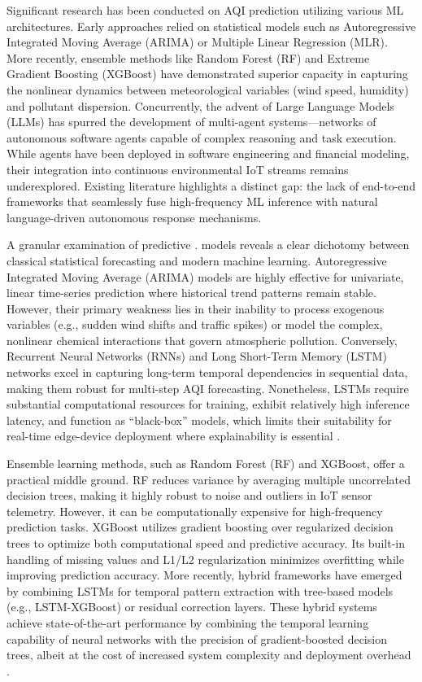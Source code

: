 \documentclass[conference]{IEEEtran}
\begin{document}
Significant research has been conducted on AQI prediction utilizing various ML architectures. Early approaches relied on statistical models such as Autoregressive Integrated Moving Average (ARIMA) or Multiple Linear Regression (MLR). More recently, ensemble methods like Random Forest (RF) and Extreme Gradient Boosting (XGBoost) have demonstrated superior capacity in capturing the nonlinear dynamics between meteorological variables (wind speed, humidity) and pollutant dispersion. Concurrently, the advent of Large Language Models (LLMs) has spurred the development of multi-agent systems---networks of autonomous software agents capable of complex reasoning and task execution. While agents have been deployed in software engineering and financial modeling, their integration into continuous environmental IoT streams remains underexplored. Existing literature highlights a distinct gap: the lack of end-to-end frameworks that seamlessly fuse high-frequency ML inference with natural language-driven autonomous response mechanisms.

A granular examination of predictive \cite{b18,b19}. models reveals a clear dichotomy between classical statistical forecasting and modern machine learning. Autoregressive Integrated Moving Average (ARIMA) models are highly effective for univariate, linear time-series prediction where historical trend patterns remain stable. However, their primary weakness lies in their inability to process exogenous variables (e.g., sudden wind shifts and traffic spikes) or model the complex, nonlinear chemical interactions that govern atmospheric pollution. Conversely, Recurrent Neural Networks (RNNs) and Long Short-Term Memory (LSTM) networks excel in capturing long-term temporal dependencies in sequential data, making them robust for multi-step AQI forecasting. Nonetheless, LSTMs require substantial computational resources for training, exhibit relatively high inference latency, and function as ``black-box'' models, which limits their suitability for real-time edge-device deployment where explainability is essential \cite{b20,b21}.

Ensemble learning methods, such as Random Forest (RF) and XGBoost, offer a practical middle ground. RF reduces variance by averaging multiple uncorrelated decision trees, making it highly robust to noise and outliers in IoT sensor telemetry. However, it can be computationally expensive for high-frequency prediction tasks. XGBoost utilizes gradient boosting over regularized decision trees to optimize both computational speed and predictive accuracy. Its built-in handling of missing values and L1/L2 regularization minimizes overfitting while improving prediction accuracy. More recently, hybrid frameworks have emerged by combining LSTMs for temporal pattern extraction with tree-based models (e.g., LSTM-XGBoost) or residual correction layers. These hybrid systems achieve state-of-the-art performance by combining the temporal learning capability of neural networks with the precision of gradient-boosted decision trees, albeit at the cost of increased system complexity and deployment overhead \cite{b2,b5,b6,b22}.
\end{document}
